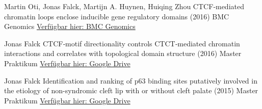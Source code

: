 

\begin{cventries}

\cventry
  {Martin Oti, Jonas Falck, Martijn A. Huynen, Huiqing Zhou} %
  {CTCF‑mediated chromatin loops enclose inducible gene regulatory domains (2016)} %
  {BMC Genomics} %
  {\href{https://bmcgenomics.biomedcentral.com/articles/10.1186/s12864-016-2516-6}{Verfügbar hier: BMC Genomics}}
  {
    \vspace{-2cm}
  }

\cventry
  {Jonas Falck} %
  {CTCF‑motif directionality controls CTCT‑mediated chromatin interactions and correlates
  with topological domain structure (2016)} %
  {Master Praktikum} %
  {\href{https://drive.google.com/file/d/1fE28UxBNoNXvjtaJWrduGhyCLluwIuqX}{Verfügbar hier: Google Drive}} %
  {
    \vspace{-2cm}
  }

\cventry
{Jonas Falck} %
{Identification and ranking of p63 binding sites putatively involved in the etiology of non-syndromic cleft lip with or without cleft palate (2015)} %
{Master Praktikum} %
{\href{https://drive.google.com/file/d/1oTAbdeJxjvjaEwvUDPoQi8nnGD8l52i_}{Verfügbar hier: Google Drive}} %
{
  \vspace{-2cm}
}

\end{cventries}
